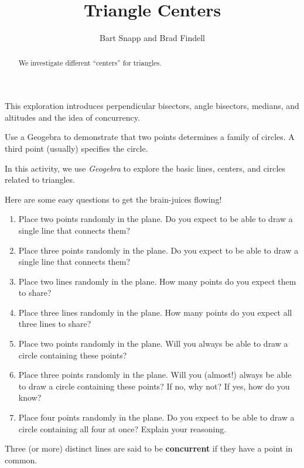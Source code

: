 \documentclass[nooutcomes]{ximera}
\title{Triangle Centers}
\author{Bart Snapp and Brad Findell}
\begin{document}
\begin{abstract}
  We investigate different ``centers'' for triangles.
\end{abstract}
\maketitle

\begin{teachingnote}
This exploration introduces perpendicular bisectors, angle bisectors, medians, and altitudes and the idea of concurrency.  

Use a Geogebra to demonstrate that two points determines a family of circles.  A third point (usually) specifies the circle.
\end{teachingnote}

In this activity, we use \textsl{Geogebra} to explore the basic lines, centers, and circles related to triangles.  

\begin{problem} Here are some easy questions to get the brain-juices flowing!
\begin{enumerate} 
\itemsep -3pt
\item Place two points randomly in the plane. Do you expect to be able to
draw a single line that connects them?
\item Place three points randomly in the plane. Do you expect to be able to
draw a single line that connects them?
\item Place two lines randomly in the plane. How many points do you expect
them to share?
\item Place three lines randomly in the plane. How many points do you expect
all three lines to share?
\item Place two points randomly in the plane. Will you always be
able to draw a circle containing these points?
\item Place three points randomly in the plane. Will you (almost!) always be
able to draw a circle containing these points? If no, why not? If yes,
how do you know?
\item Place four points randomly in the plane. Do you expect to be able to
draw a circle containing all four at once? Explain your reasoning.
\end{enumerate}
\end{problem}

\begin{definition}
Three (or more) distinct lines are said to be \textbf{concurrent} if they have a point in common.  
\end{definition}
\end{document}
